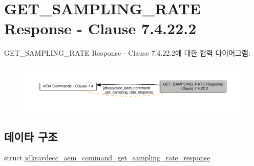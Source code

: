 \hypertarget{group__command__get__sampling__rate__response}{}\section{G\+E\+T\+\_\+\+S\+A\+M\+P\+L\+I\+N\+G\+\_\+\+R\+A\+TE Response -\/ Clause 7.4.22.2}
\label{group__command__get__sampling__rate__response}
G\+E\+T\+\_\+\+S\+A\+M\+P\+L\+I\+N\+G\+\_\+\+R\+A\+TE Response -\/ Clause 7.4.22.2에 대한 협력 다이어그램\+:
\nopagebreak
\begin{figure}[H]
\begin{center}
\leavevmode
\includegraphics[width=350pt]{group__command__get__sampling__rate__response}
\end{center}
\end{figure}
\subsection*{데이타 구조}
\begin{DoxyCompactItemize}
\item 
struct \hyperlink{structjdksavdecc__aem__command__get__sampling__rate__response}{jdksavdecc\+\_\+aem\+\_\+command\+\_\+get\+\_\+sampling\+\_\+rate\+\_\+response}
\end{DoxyCompactItemize}
